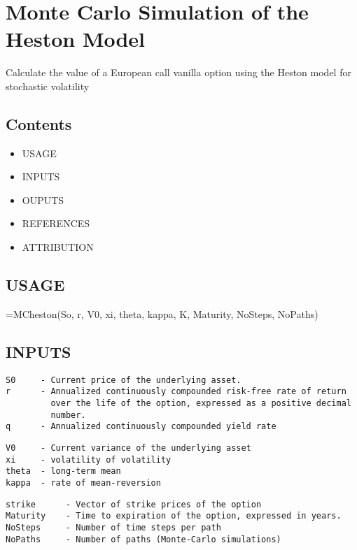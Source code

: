 
    
\section*{Monte Carlo Simulation of the Heston Model}

\begin{par}
Calculate the value of a European call vanilla option using the Heston model for stochastic volatility
\end{par} \vspace{1em}

\subsection*{Contents}

\begin{itemize}
\setlength{\itemsep}{-1ex}
   \item USAGE
   \item INPUTS
   \item OUPUTS
   \item REFERENCES
   \item ATTRIBUTION
\end{itemize}


\subsection*{USAGE}

\begin{par}
=MCheston(So, r, V0, xi, theta, kappa, K, Maturity,                 NoSteps, NoPaths)
\end{par} \vspace{1em}


\subsection*{INPUTS}

\begin{verbatim}S0     - Current price of the underlying asset.
r      - Annualized continuously compounded risk-free rate of return
         over the life of the option, expressed as a positive decimal
         number.
q      - Annualized continuously compounded yield rate\end{verbatim}
\begin{verbatim}V0     - Current variance of the underlying asset
xi     - volatility of volatility
theta  - long-term mean
kappa  - rate of mean-reversion\end{verbatim}
\begin{verbatim}strike      - Vector of strike prices of the option
Maturity    - Time to expiration of the option, expressed in years.
NoSteps     - Number of time steps per path
NoPaths     - Number of paths (Monte-Carlo simulations)\end{verbatim}


